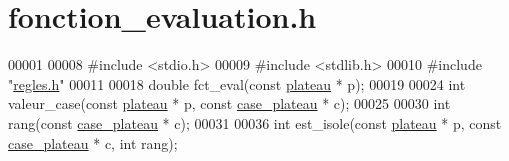 \hypertarget{fonction__evaluation_8h_source}{
\section{fonction\_\-evaluation.h}
}

\begin{DoxyCode}
00001 
00008 \textcolor{preprocessor}{#include <stdio.h>}
00009 \textcolor{preprocessor}{#include <stdlib.h>}
00010 \textcolor{preprocessor}{#include "\hyperlink{regles_8h}{regles.h}"}
00011 
00018 \textcolor{keywordtype}{double} fct\_eval(\textcolor{keyword}{const} \hyperlink{structplateau}{plateau} * p);
00019 
00024 \textcolor{keywordtype}{int} valeur\_case(\textcolor{keyword}{const} \hyperlink{structplateau}{plateau} * p, \textcolor{keyword}{const} \hyperlink{structcase__plateau}{case_plateau} * c);
00025 
00030 \textcolor{keywordtype}{int} rang(\textcolor{keyword}{const} \hyperlink{structcase__plateau}{case_plateau} * c);
00031 
00036 \textcolor{keywordtype}{int} est\_isole(\textcolor{keyword}{const} \hyperlink{structplateau}{plateau} * p, \textcolor{keyword}{const} \hyperlink{structcase__plateau}{case_plateau} * c, \textcolor{keywordtype}{int} rang);
\end{DoxyCode}
